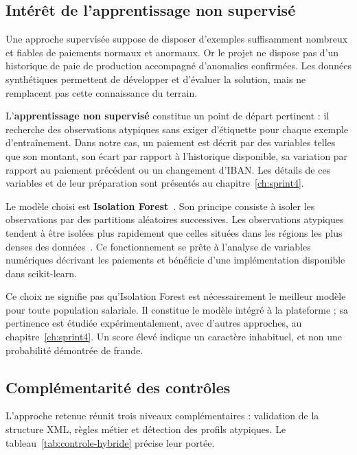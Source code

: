 \subsection{Intérêt de l'apprentissage non supervisé}

Une approche supervisée suppose de disposer d'exemples suffisamment nombreux et fiables de paiements normaux et anormaux. Or le projet ne dispose pas d'un historique de paie de production accompagné d'anomalies confirmées. Les données synthétiques permettent de développer et d'évaluer la solution, mais ne remplacent pas cette connaissance du terrain.

L'\textbf{apprentissage non supervisé} constitue un point de départ pertinent : il recherche des observations atypiques sans exiger d'étiquette pour chaque exemple d'entraînement. Dans notre cas, un paiement est décrit par des variables telles que son montant, son écart par rapport à l'historique disponible, sa variation par rapport au paiement précédent ou un changement d'IBAN. Les détails de ces variables et de leur préparation sont présentés au chapitre~\ref{ch:sprint4}.

Le modèle choisi est \textbf{Isolation Forest}~\cite{liu2008isolation}. Son principe consiste à isoler les observations par des partitions aléatoires successives. Les observations atypiques tendent à être isolées plus rapidement que celles situées dans les régions les plus denses des données~\cite{sklearn-iforest}. Ce fonctionnement se prête à l'analyse de variables numériques décrivant les paiements et bénéficie d'une implémentation disponible dans scikit-learn.

Ce choix ne signifie pas qu'Isolation Forest est nécessairement le meilleur modèle pour toute population salariale. Il constitue le modèle intégré à la plateforme ; sa pertinence est étudiée expérimentalement, avec d'autres approches, au chapitre~\ref{ch:sprint4}. Un score élevé indique un caractère inhabituel, et non une probabilité démontrée de fraude.

\subsection{Complémentarité des contrôles}

L'approche retenue réunit trois niveaux complémentaires : validation de la structure XML, règles métier et détection des profils atypiques. Le tableau~\ref{tab:controle-hybride} précise leur portée.

